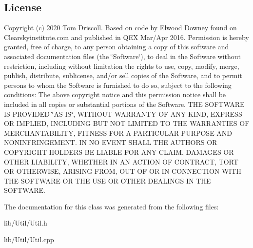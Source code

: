 \hypertarget{main_8cpp_license}{}\subsection{License}\label{main_8cpp_license}
Copyright (c) 2020 Tom Driscoll. Based on code by Elwood Downey found on Clearskyinstitute.\+com and published in Q\+EX Mar/\+Apr 2016. Permission is hereby granted, free of charge, to any person obtaining a copy of this software and associated documentation files (the \char`\"{}\+Software\char`\"{}), to deal in the Software without restriction, including without limitation the rights to use, copy, modify, merge, publish, distribute, sublicense, and/or sell copies of the Software, and to permit persons to whom the Software is furnished to do so, subject to the following conditions\+: The above copyright notice and this permission notice shall be included in all copies or substantial portions of the Software. T\+HE S\+O\+F\+T\+W\+A\+RE IS P\+R\+O\+V\+I\+D\+ED \char`\"{}\+A\+S I\+S\char`\"{}, W\+I\+T\+H\+O\+UT W\+A\+R\+R\+A\+N\+TY OF A\+NY K\+I\+ND, E\+X\+P\+R\+E\+SS OR I\+M\+P\+L\+I\+ED, I\+N\+C\+L\+U\+D\+I\+NG B\+UT N\+OT L\+I\+M\+I\+T\+ED TO T\+HE W\+A\+R\+R\+A\+N\+T\+I\+ES OF M\+E\+R\+C\+H\+A\+N\+T\+A\+B\+I\+L\+I\+TY, F\+I\+T\+N\+E\+SS F\+OR A P\+A\+R\+T\+I\+C\+U\+L\+AR P\+U\+R\+P\+O\+SE A\+ND N\+O\+N\+I\+N\+F\+R\+I\+N\+G\+E\+M\+E\+NT. IN NO E\+V\+E\+NT S\+H\+A\+LL T\+HE A\+U\+T\+H\+O\+RS OR C\+O\+P\+Y\+R\+I\+G\+HT H\+O\+L\+D\+E\+RS BE L\+I\+A\+B\+LE F\+OR A\+NY C\+L\+A\+IM, D\+A\+M\+A\+G\+ES OR O\+T\+H\+ER L\+I\+A\+B\+I\+L\+I\+TY, W\+H\+E\+T\+H\+ER IN AN A\+C\+T\+I\+ON OF C\+O\+N\+T\+R\+A\+CT, T\+O\+RT OR O\+T\+H\+E\+R\+W\+I\+SE, A\+R\+I\+S\+I\+NG F\+R\+OM, O\+UT OF OR IN C\+O\+N\+N\+E\+C\+T\+I\+ON W\+I\+TH T\+HE S\+O\+F\+T\+W\+A\+RE OR T\+HE U\+SE OR O\+T\+H\+ER D\+E\+A\+L\+I\+N\+GS IN T\+HE S\+O\+F\+T\+W\+A\+RE. 

The documentation for this class was generated from the following files\+:\begin{DoxyCompactItemize}
\item 
lib/\+Util/Util.\+h\item 
lib/\+Util/Util.\+cpp\end{DoxyCompactItemize}
